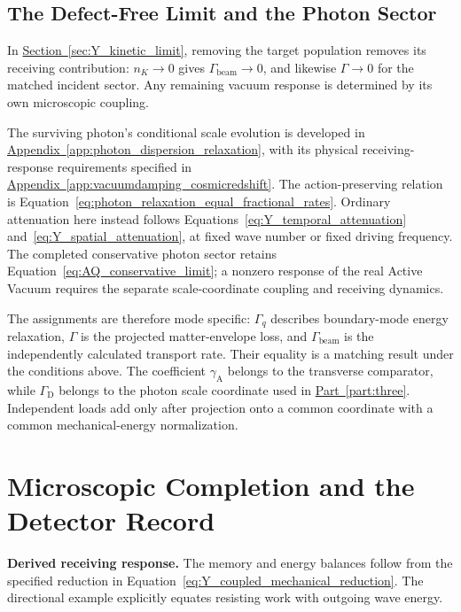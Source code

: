 \subsection{The Defect-Free Limit and the Photon Sector}
\label{sec:Y_photon_comparison}

In \hyperref[sec:Y_kinetic_limit]{Section~\ref*{sec:Y_kinetic_limit}}, removing the target population removes its receiving contribution: $n_K\to0$ gives $\Gamma_{\mathrm{beam}}\to0$, and likewise $\Gamma\to0$ for the matched incident sector. Any remaining vacuum response is determined by its own microscopic coupling.

The surviving photon's conditional scale evolution is developed in \hyperref[app:photon_dispersion_relaxation]{Appendix~\ref*{app:photon_dispersion_relaxation}}, with its physical receiving-response requirements specified in \hyperref[app:vacuumdamping_cosmicredshift]{Appendix~\ref*{app:vacuumdamping_cosmicredshift}}. The action-preserving relation is Equation~\eqref{eq:photon_relaxation_equal_fractional_rates}. Ordinary attenuation here instead follows Equations~\eqref{eq:Y_temporal_attenuation} and~\eqref{eq:Y_spatial_attenuation}, at fixed wave number or fixed driving frequency. The completed conservative photon sector retains Equation~\eqref{eq:AQ_conservative_limit}; a nonzero response of the real Active Vacuum requires the separate scale-coordinate coupling and receiving dynamics.

The assignments are therefore mode specific: $\Gamma_q$ describes boundary-mode energy relaxation, $\Gamma$ is the projected matter-envelope loss, and $\Gamma_{\mathrm{beam}}$ is the independently calculated transport rate. Their equality is a matching result under the conditions above. The coefficient $\gamma_{\mathrm A}$ belongs to the transverse comparator, while $\Gamma_{\mathrm D}$ belongs to the photon scale coordinate used in \hyperref[part:three]{Part~\ref*{part:three}}. Independent loads add only after projection onto a common coordinate with a common mechanical-energy normalization.

\section{Microscopic Completion and the Detector Record}

\noindent\textbf{Derived receiving response.}
The memory and energy balances follow from the specified reduction in Equation~\eqref{eq:Y_coupled_mechanical_reduction}. The directional example explicitly equates resisting work with outgoing wave energy.

